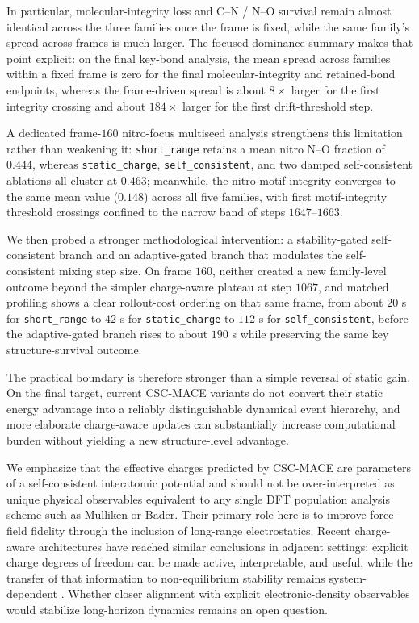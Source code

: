 In particular, molecular-integrity loss and C--N / N--O survival remain almost identical across the three families once the frame is fixed, while the same family's spread across frames is much larger. The focused dominance summary makes that point explicit: on the final key-bond analysis, the mean spread across families within a fixed frame is zero for the final molecular-integrity and retained-bond endpoints, whereas the frame-driven spread is about $8\times$ larger for the first integrity crossing and about $184\times$ larger for the first drift-threshold step.

A dedicated frame-$160$ nitro-focus multiseed analysis strengthens this limitation rather than weakening it: \texttt{short\_range} retains a mean nitro N--O fraction of $0.444$, whereas \texttt{static\_charge}, \texttt{self\_consistent}, and two damped self-consistent ablations all cluster at $0.463$; meanwhile, the nitro-motif integrity converges to the same mean value ($0.148$) across all five families, with first motif-integrity threshold crossings confined to the narrow band of steps $1647$--$1663$.

We then probed a stronger methodological intervention: a stability-gated self-consistent branch and an adaptive-gated branch that modulates the self-consistent mixing step size. On frame $160$, neither created a new family-level outcome beyond the simpler charge-aware plateau at step $1067$, and matched profiling shows a clear rollout-cost ordering on that same frame, from about $20$ s for \texttt{short\_range} to $42$ s for \texttt{static\_charge} to $112$ s for \texttt{self\_consistent}, before the adaptive-gated branch rises to about $190$ s while preserving the same key structure-survival outcome.

The practical boundary is therefore stronger than a simple reversal of static gain. On the final target, current CSC-MACE variants do not convert their static energy advantage into a reliably distinguishable dynamical event hierarchy, and more elaborate charge-aware updates can substantially increase computational burden without yielding a new structure-level advantage.

We emphasize that the effective charges predicted by CSC-MACE are parameters of a self-consistent interatomic potential and should not be over-interpreted as unique physical observables equivalent to any single DFT population analysis scheme such as Mulliken or Bader. Their primary role here is to improve force-field fidelity through the inclusion of long-range electrostatics. Recent charge-aware architectures have reached similar conclusions in adjacent settings: explicit charge degrees of freedom can be made active, interpretable, and useful, while the transfer of that information to non-equilibrium stability remains system-dependent \cite{fuchs2025celli,jung2026charge}. Whether closer alignment with explicit electronic-density observables would stabilize long-horizon dynamics remains an open question.

